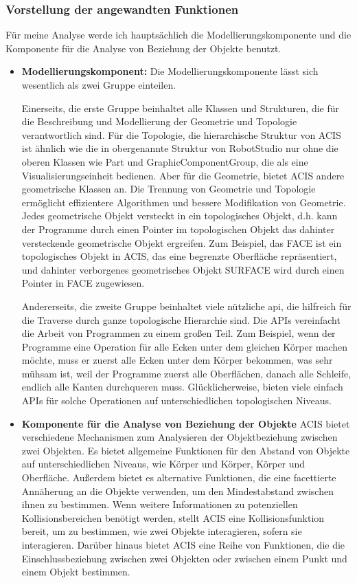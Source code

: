 \documentclass[14pt,a4paper,titlepage]{article}
\begin{document}
			\subsubsection{Vorstellung der angewandten Funktionen}
			Für meine Analyse werde ich hauptsächlich die Modellierungskomponente und die Komponente für die Analyse von Beziehung der Objekte benutzt. 
			\begin{itemize}
				\item 
				\textbf{Modellierungskomponent:}
				Die Modellierungskomponente lässt sich wesentlich als zwei Gruppe einteilen.
				
				 Einerseits, die erste Gruppe beinhaltet alle Klassen und Strukturen, die für die Beschreibung und Modellierung der Geometrie und Topologie verantwortlich sind. Für die Topologie, die hierarchische Struktur von ACIS ist ähnlich wie die in obergenannte Struktur von RobotStudio nur ohne die oberen Klassen wie Part und GraphicComponentGroup, die als eine Visualisierungseinheit bedienen. Aber für die Geometrie, bietet ACIS andere geometrische Klassen an. Die Trennung von Geometrie und Topologie ermöglicht effizientere Algorithmen und bessere Modifikation von Geometrie. Jedes geometrische Objekt versteckt in ein topologisches Objekt, d.h. kann der Programme durch einen Pointer im topologischen Objekt das dahinter versteckende geometrische Objekt ergreifen. Zum Beispiel, das FACE ist ein topologisches Objekt in ACIS, das eine begrenzte Oberfläche repräsentiert, und dahinter verborgenes geometrisches Objekt SURFACE wird durch einen Pointer in FACE zugewiesen.
				 
				 Andererseits, die zweite Gruppe beinhaltet viele nützliche \ac{api}, die hilfreich für die Traverse durch ganze topologische Hierarchie sind.  Die APIs vereinfacht die Arbeit von Programmen zu einem großen Teil. Zum Beispiel, wenn der Programme eine Operation für alle Ecken unter dem gleichen Körper machen möchte, muss er zuerst alle Ecken unter dem Körper bekommen, was sehr mühsam ist, weil der Programme zuerst alle Oberflächen, danach alle Schleife, endlich alle Kanten durchqueren muss.  Glücklicherweise, bieten viele einfach APIs für solche Operationen auf unterschiedlichen topologischen Niveaus. 
				\pagebreak
				\item 
				\textbf{Komponente für die Analyse von Beziehung der Objekte}
				ACIS bietet verschiedene Mechanismen zum Analysieren der Objektbeziehung zwischen zwei Objekten. Es bietet allgemeine Funktionen für den Abstand von Objekte auf unterschiedlichen Niveaus, wie Körper und Körper, Körper und Oberfläche. Außerdem bietet es alternative Funktionen, die eine facettierte Annäherung an die Objekte verwenden, um den Mindestabstand zwischen ihnen zu bestimmen. Wenn weitere Informationen zu potenziellen Kollisionsbereichen benötigt werden, stellt ACIS eine Kollisionsfunktion bereit, um zu bestimmen, wie zwei Objekte interagieren, sofern sie interagieren. Darüber hinaus bietet ACIS eine Reihe von Funktionen, die die Einschlussbeziehung zwischen zwei Objekten oder zwischen einem Punkt und einem Objekt bestimmen.
				
			\end{itemize}
\end{document}
